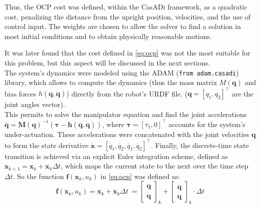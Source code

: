 \noindent Thus, the OCP cost was defined, within the CasADi framework, as a quadratic cost, penalizing the distance from the upright position, velocities, and the use of control input. The weights are chosen to allow the solver to find a solution in most initial conditions and to obtain physically reasonable motions.

It was later found that the cost defined in \eqref{eq:ocp} was not the most suitable for this problem, but this aspect will be discussed in the next sections.\\


\noindent The system's dynamics were modeled using the ADAM (\texttt{from adam.casadi}) library, which allows to compute the dynamics (thus the mass matrix $M(\mathbf{q})$ and bias forces $h(\mathbf{q}, \dot{\mathbf{q}})$) directly from the robot's URDF file. ($\mathbf{q} = [q_1, q_2]^\top$ are the joint angles vector).\\


\noindent This permits to solve the manipulator equation and find the joint accelerations $\ddot{\mathbf{q}} = \mathbf{M}(\mathbf{q})^{-1} (\boldsymbol{\tau} - \mathbf{h}(\mathbf{q}, \dot{\mathbf{q}}))$, where $\boldsymbol{\tau} = [\tau_1, 0]^\top$ accounts for the system's under-actuation. These accelerations were concatenated with the joint velocities $\dot{\mathbf{q}}$ to form the state derivative $\dot{\mathbf{x}} = [\dot{{q_1}}, \dot{q_2}, \ddot{{q_1}}, \ddot{{q_2}}]^\top$. Finally, the discrete-time state transition is achieved via an explicit Euler integration scheme, defined as $\mathbf{x}_{k+1} = \mathbf{x}_k + \dot{\mathbf{x}}_k \Delta t$, which maps the current state to the next over the time step $\Delta t$. 
So the function $\mathbf{f}(\mathbf{x}_k, u_k)$ in \eqref{eq:ocp} was defined as:
\begin{equation}
    \mathbf{f}(\mathbf{x}_k, u_k) = \mathbf{x}_k + \dot{\mathbf{x}}_k \Delta t  \  = \begin{bmatrix} \mathbf{q} \\ \dot{\mathbf{q}} \end{bmatrix}_{k} + \begin{bmatrix} \dot{\mathbf{q}} \\ \ddot{\mathbf{q}} \end{bmatrix}_{k} \cdot \Delta t
\end{equation}


